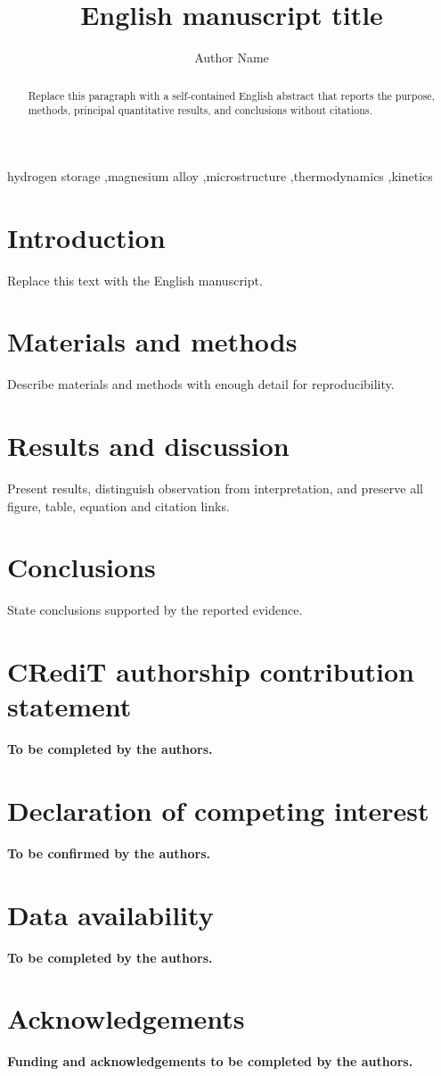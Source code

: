 \documentclass[preprint,12pt]{elsarticle}
\begin{document}
\begin{frontmatter}

\title{English manuscript title}

\author[aff1]{Author Name}

\begin{abstract}
Replace this paragraph with a self-contained English abstract that reports the purpose, methods, principal quantitative results, and conclusions without citations.
\end{abstract}

\begin{keyword}
hydrogen storage \sep magnesium alloy \sep microstructure \sep thermodynamics \sep kinetics
\end{keyword}

\end{frontmatter}

\section{Introduction}
Replace this text with the English manuscript.

\section{Materials and methods}
Describe materials and methods with enough detail for reproducibility.

\section{Results and discussion}
Present results, distinguish observation from interpretation, and preserve all figure, table, equation and citation links.

\section{Conclusions}
State conclusions supported by the reported evidence.

\section*{CRediT authorship contribution statement}
\textbf{To be completed by the authors.}

\section*{Declaration of competing interest}
\textbf{To be confirmed by the authors.}

\section*{Data availability}
\textbf{To be completed by the authors.}

\section*{Acknowledgements}
\textbf{Funding and acknowledgements to be completed by the authors.}



\end{document}
